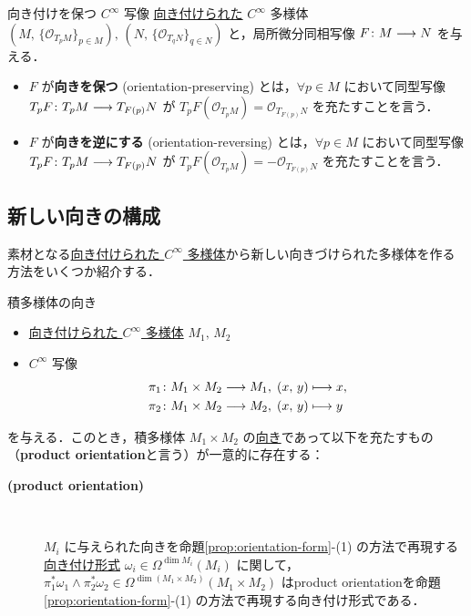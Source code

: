 \documentclass[geometry_main]{subfiles}
\begin{document}
\begin{mydef}[label=def:orientation-preserving]{向き付けを保つ $C^\infty$ 写像}
    \hyperref[def:smooth-orientation]{向き付けられた} $C^\infty$ 多様体 $(M,\, \{\mathcal{O}_{T_p M}\}_{p \in M}),\, (N,\, \{\mathcal{O}_{T_q N}\}_{q \in N})$ と，局所微分同相写像 $F \colon M \longrightarrow N$ を与える．
    
    \begin{itemize}
        \item $F$ が\textbf{向きを保つ} (orientation-preserving) とは，$\forall p \in M$ において同型写像 $T_p F \colon T_p M \longrightarrow T_{F(p)} N$ が $T_p F (\mathcal{O}_{T_p M}) = \mathcal{O}_{T_{F(p)} N}$ を充たすことを言う．
        \item $F$ が\textbf{向きを逆にする} (orientation-reversing) とは，$\forall p \in M$ において同型写像 $T_p F \colon T_p M \longrightarrow T_{F(p)} N$ が $T_p F (\mathcal{O}_{T_p M}) = -\mathcal{O}_{T_{F(p)} N}$ を充たすことを言う．
    \end{itemize}

\end{mydef}

\subsection{新しい向きの構成}

素材となる\hyperref[def:smooth-orientation]{向き付けられた $C^\infty$ 多様体}から新しい向きづけられた多様体を作る方法をいくつか紹介する．

\begin{myprop}[label=prop:product-orientation]{積多様体の向き}
	\begin{itemize}
		\item \hyperref[def:smooth-orientation]{向き付けられた $C^\infty$ 多様体} $M_1,\, M_2$
		\item $C^\infty$ 写像
		\begin{align}
			\pi_1 &\colon M_1 \times M_2 \longrightarrow M_1,\; (x,\, y) \longmapsto x, \\
			\pi_2 &\colon M_1 \times M_2 \longrightarrow M_2,\; (x,\, y) \longmapsto y
		\end{align}
	\end{itemize}
	を与える．このとき，積多様体 $M_1 \times M_2$ の\hyperref[def:smooth-orientation]{向き}であって以下を充たすもの（\textbf{product orientation}と言う）が一意的に存在する：

	\begin{description}
		\item[\textbf{(product orientation)}]　
		
		$M_i$ に与えられた向きを命題\ref{prop:orientation-form}-(1) の方法で再現する\hyperref[def:orientation-form]{向き付け形式} $\omega_i \in \Omega^{\dim M_i}(M_i)$ に関して，$\pi_1^* \omega_1 \wedge \pi_2^* \omega_2 \in \Omega^{\dim (M_1 \times M_2)} (M_1 \times M_2)$ はproduct orientationを命題\ref{prop:orientation-form}-(1) の方法で再現する向き付け形式である．
	\end{description}
\end{myprop}
\end{document}
